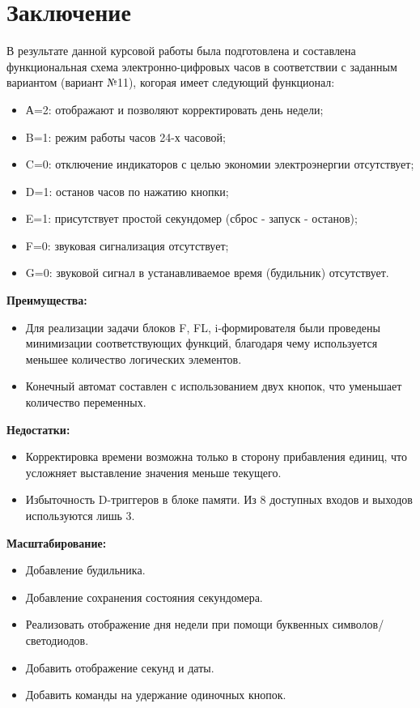 \documentclass[a4paper, final]{article}
\begin{document}
\section*{Заключение}
В результате данной курсовой работы была подготовлена и составлена функциональная схема электронно-цифровых часов в соответствии с заданным вариантом (вариант №11), когорая имеет следующий функционал:
\begin{itemize}
  \item А=2: отображают и позволяют корректировать день недели;
  \item B=1: режим работы часов 24-х часовой;
  \item C=0: отключение индикаторов с целью экономии электроэнергии отсутствует; 
  \item D=1: останов часов по нажатию кнопки;
  \item E=1: присутствует простой секундомер (сброс - запуск - останов);
  \item F=0: звуковая сигнализация отсутствует; 
  \item G=0: звуковой сигнал в устанавливаемое время (будильник) отсутствует.
\end{itemize}

\noindent \textbf{Преимущества:}
\begin{itemize}
\item Для реализации задачи блоков F, FL, i-формирователя были проведены минимизации соответствующих функций, благодаря чему используется меньшее количество логических элементов.
\item Конечный автомат составлен с использованием двух кнопок, что уменьшает количество переменных.
\end{itemize}

\noindent \textbf{Недостатки:}
\begin{itemize}
\item Корректировка времени возможна только в сторону прибавления единиц, что усложняет выставление значения меньше текущего.
\item Избыточность D-триггеров в блоке памяти. Из 8 доступных входов и выходов используются лишь 3.
\end{itemize}

\noindent \textbf{Масштабирование:}
\begin{itemize}
\item Добавление будильника.
\item Добавление сохранения состояния секундомера.
\item Реализовать отображение дня недели при помощи буквенных символов/светодиодов.
\item Добавить отображение секунд и даты.
\item Добавить команды на удержание одиночных кнопок.
\end{itemize}
\end{document}

